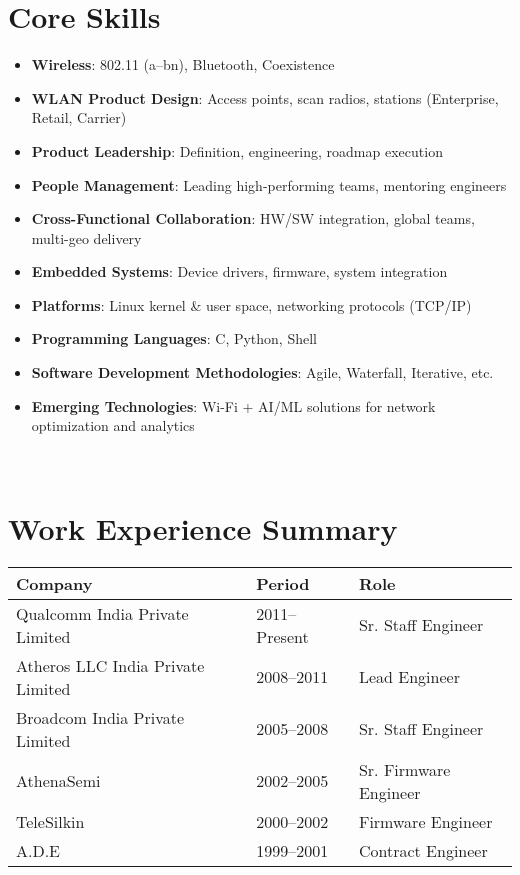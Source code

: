 \documentclass[a4paper,11pt]{article}
\begin{document}
\section*{Core Skills}
\begin{itemize}
    \item \textbf{Wireless}: 802.11 (a–bn), Bluetooth, Coexistence
    \item \textbf{WLAN Product Design}: Access points, scan radios, stations (Enterprise, Retail, Carrier)
    \item \textbf{Product Leadership}: Definition, engineering, roadmap execution
    \item \textbf{People Management}: Leading high-performing teams, mentoring engineers
    \item \textbf{Cross-Functional Collaboration}: HW/SW integration, global teams, multi-geo delivery
    \item \textbf{Embedded Systems}: Device drivers, firmware, system integration
    \item \textbf{Platforms}: Linux kernel \& user space, networking protocols (TCP/IP)
    \item \textbf{Programming Languages}: C, Python, Shell
    \item \textbf{Software Development Methodologies}: Agile, Waterfall, Iterative, etc.
    \item \textbf{Emerging Technologies}: Wi-Fi + AI/ML solutions for network optimization and analytics
\end{itemize}

\mbox{} \\

\section*{Work Experience Summary}
\begin{flushleft}
\renewcommand{\arraystretch}{1.3}
\begin{tabularx}{\textwidth}{@{} l l X @{}}
\textbf{Company} & \textbf{Period} & \textbf{Role} \\
\hline
Qualcomm India Private Limited & 2011--Present & Sr. Staff Engineer \\
Atheros LLC India Private Limited & 2008--2011 & Lead Engineer \\
Broadcom India Private Limited & 2005--2008 & Sr. Staff Engineer \\
AthenaSemi & 2002--2005 & Sr. Firmware Engineer \\
TeleSilkin & 2000--2002 & Firmware Engineer \\
A.D.E & 1999--2001 & Contract Engineer \\
\end{tabularx}
\end{flushleft}
\end{document}
